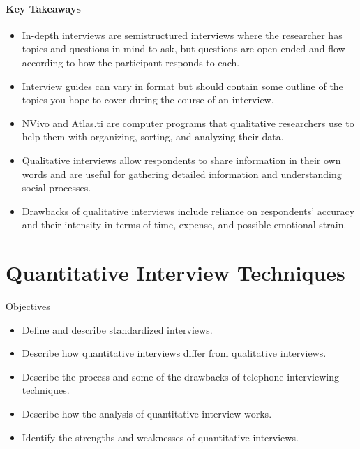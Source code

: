 \paragraph{Key Takeaways}

\begin{itemize}
	\setlength{\itemsep}{0pt}
	\setlength{\parskip}{0pt}
	\setlength{\parsep}{0pt}
	
	\item In-depth interviews are semistructured interviews where the researcher has topics and questions in mind to ask, but questions are open ended and flow according to how the participant responds to each.
	\item Interview guides can vary in format but should contain some outline of the topics you hope to cover during the course of an interview.
	\item NVivo and Atlas.ti are computer programs that qualitative researchers use to help them with organizing, sorting, and analyzing their data.
	\item Qualitative interviews allow respondents to share information in their own words and are useful for gathering detailed information and understanding social processes.
	\item Drawbacks of qualitative interviews include reliance on respondents’ accuracy and their intensity in terms of time, expense, and possible emotional strain.
	
\end{itemize}

\section{Quantitative Interview Techniques}

\begin{center}
	\begin{objbox}{Objectives}
		\begin{itemize}
			\setlength{\itemsep}{0pt}
			\setlength{\parskip}{0pt}
			\setlength{\parsep}{0pt}
			
			\item Define and describe standardized interviews.
			\item Describe how quantitative interviews differ from qualitative interviews.
			\item Describe the process and some of the drawbacks of telephone interviewing techniques.
			\item Describe how the analysis of quantitative interview works.
			\item Identify the strengths and weaknesses of quantitative interviews.
			
		\end{itemize}
	\end{objbox}
\end{center}

